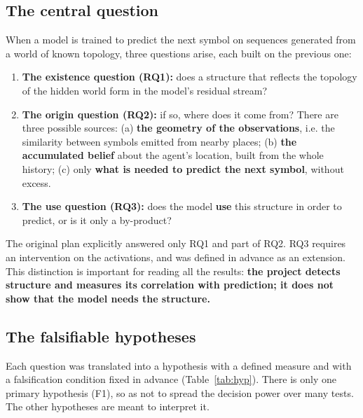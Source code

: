 \documentclass[12pt,a4paper]{article}
\newcommand{\en}[1]{\foreignlanguage{english}{#1}}   %
\begin{document}
\subsection{The central question}
When a model is trained to predict the next symbol on sequences generated from a world of known topology, three questions arise, each built on the previous one:
\begin{enumerate}[leftmargin=*]
\item \textbf{The existence question (RQ1):} does a structure that reflects the topology of the hidden world form in the model's \en{residual stream}?
\item \textbf{The origin question (RQ2):} if so, where does it come from? There are three possible sources: (a) \textbf{the geometry of the observations}, i.e. the similarity between symbols emitted from nearby places; (b) \textbf{the accumulated belief} about the agent's location, built from the whole history; (c) only \textbf{what is needed to predict the next symbol}, without excess.
\item \textbf{The use question (RQ3):} does the model \textbf{use} this structure in order to predict, or is it only a by-product?
\end{enumerate}
The original plan explicitly answered only RQ1 and part of RQ2. RQ3 requires an intervention on the activations, and was defined in advance as an extension. This distinction is important for reading all the results: \textbf{the project detects structure and measures its correlation with prediction; it does not show that the model needs the structure.}

\subsection{The falsifiable hypotheses}
Each question was translated into a hypothesis with a defined measure and with a falsification condition fixed in advance (Table~\ref{tab:hyp}). There is only one primary hypothesis (F1), so as not to spread the decision power over many tests. The other hypotheses are meant to interpret it.
\end{document}
